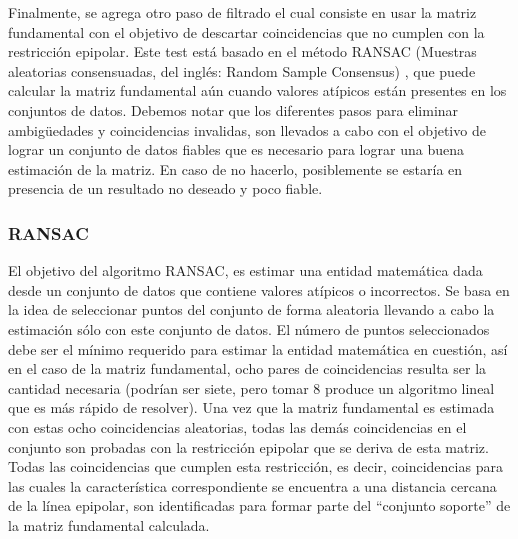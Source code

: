 \documentclass[a4paper,11pt,spanish]{article}
\begin{document}

Finalmente, se agrega otro paso de filtrado el cual consiste en usar la matriz fundamental con el objetivo de descartar coincidencias que no cumplen con la restricción epipolar. Este test está basado en el método RANSAC (Muestras aleatorias consensuadas, del inglés: Random Sample Consensus) \cite{bb38231, Fischler:1981:RSC:358669.358692, bb38231, bb53732, Chum-PhD-TR-2005-19}, que puede calcular la matriz fundamental aún cuando valores atípicos están presentes en los conjuntos de datos.
Debemos notar que los diferentes pasos para eliminar ambigüedades y coincidencias invalidas, son llevados a cabo con el objetivo de lograr un conjunto de datos fiables que es necesario para lograr una buena estimación de la matriz. En caso de no hacerlo, posiblemente se estaría en presencia de un resultado no deseado y poco fiable.

\subsubsection{RANSAC}
El objetivo del algoritmo RANSAC, es estimar una entidad matemática dada desde un conjunto de datos que contiene valores atípicos o incorrectos. Se basa en la idea de seleccionar puntos del conjunto de forma aleatoria llevando a cabo la estimación sólo con este conjunto de datos. El número de puntos seleccionados debe ser el mínimo requerido para estimar la entidad matemática en cuestión, así en el caso de la matriz fundamental, ocho pares de coincidencias resulta ser la cantidad necesaria (podrían ser siete, pero tomar 8 produce un algoritmo lineal que es más rápido de resolver). Una vez que la matriz fundamental es estimada con estas ocho coincidencias aleatorias, todas las demás coincidencias en el conjunto son probadas con la restricción epipolar que se deriva de esta matriz. Todas las coincidencias que cumplen esta restricción, es decir, coincidencias para las cuales la característica correspondiente se encuentra a una distancia cercana de la línea epipolar, son identificadas para formar parte del ``conjunto soporte'' de la matriz fundamental calculada.
\end{document}
